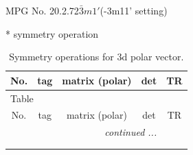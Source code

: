 \documentclass[fleqn,8pt]{jsarticle}
\begin{document}
\setcounter{MaxMatrixCols}{32}

\renewcommand{\tablename}{Table~}
\renewcommand{\figurename}{Figure~}
\begin{center}
\LARGE
MPG No. 20.2.72\quad$\bar{3}m1'$\quad(-3m11' setting)
\end{center}
* symmetry operation
\renewcommand{\arraystretch}{1.3}
\begin{longtable}{ccccc}
\caption{Symmetry operations for 3d polar vector.}
 \\
 \hline \hline
No. & tag & matrix (polar) & det & TR \\ \hline \endfirsthead

\multicolumn{4}{l}{\tablename\ \thetable{}} \\
 \hline \hline
No. & tag & matrix (polar) & det & TR \\ \hline \endhead

 \hline \hline
\multicolumn{4}{r}{\footnotesize\it continued ...} \\ \endfoot

 \hline \hline
\multicolumn{4}{r}{} \\ \endlastfoot


\end{longtable}
\end{document}
